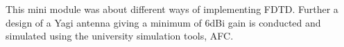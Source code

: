 This mini module was about different ways of implementing FDTD. Further a design of a Yagi antenna giving a minimum of 6dBi gain is conducted and simulated using the university simulation tools, AFC.   